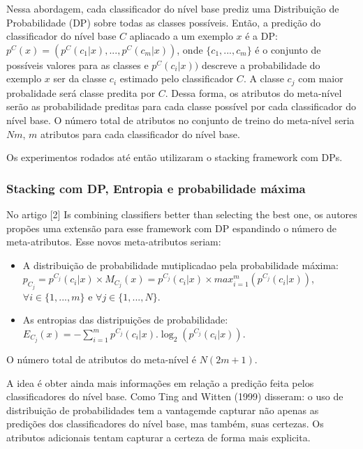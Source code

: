 \documentclass[]{article}
\begin{document}
Nessa abordagem, cada classificador do nível base prediz uma
Distribuição de Probabilidade (DP) sobre todas as classes possíveis.
Então, a predição do classificador do nível base \(C\) apliacado a um
exemplo \(x\) é a DP: \(p^C(x) = (p^C(c_1|x), ... , p^C(c_m|x))\), onde
\(\{c_1, ..., c_m\}\) é o conjunto de possíveis valores para as classes
e \(p^C(c_i|x))\) descreve a probabilidade do exemplo \(x\) ser da
classe \(c_i\) estimado pelo classificador \(C\). A classe \(c_j\) com
maior probalidade será classe predita por \(C\). Dessa forma, os
atributos do meta-nível serão as probabilidade preditas para cada classe
possível por cada classificador do nível base. O número total de
atributos no conjunto de treino do meta-nível seria \(Nm\), \(m\)
atributos para cada classificador do nível base.

Os experimentos rodados até então utilizaram o stacking framework com
DPs.

\subsubsection{Stacking com DP, Entropia e probabilidade
máxima}\label{stacking-com-dp-entropia-e-probabilidade-maxima}

No artigo {[}2{]} Is combining classifiers better than selecting the
best one, os autores propões uma extensão para esse framework com DP
espandindo o número de meta-atributos. Esse novos meta-atributos seriam:

\begin{itemize}
\item
  A distribuição de probabilidade mutiplicadao pela probabilidade
  máxima:
  \(p_{C_j} = p^{C_j}(c_i|x) \times M_{C_j}(x) = p^{C_j}(c_i|x) \times max_{i=1}^{m}(p^{C_j}(c_i|x))\),
  \(\forall i \in \{1,...,m\}\) e \(\forall j \in \{1,...,N\}\).
\item
  As entropias das distripuições de probabilidade:
  \(E_{C_j}(x) = -\sum_{i=1}^{m}p^{C_j}(c_i|x).\log_2(p^{C_j}(c_i|x))\).
\end{itemize}

O número total de atributos do meta-nível é \(N(2m+1)\).

A idea é obter ainda mais informações em relação a predição feita pelos
classificadores do nível base. Como Ting and Witten (1999) disseram: o
uso de distribuição de probabilidades tem a vantagemde capturar não
apenas as predições dos classificadores do nível base, mas também, suas
certezas. Os atributos adicionais tentam capturar a certeza de forma
mais explicita.
\end{document}
